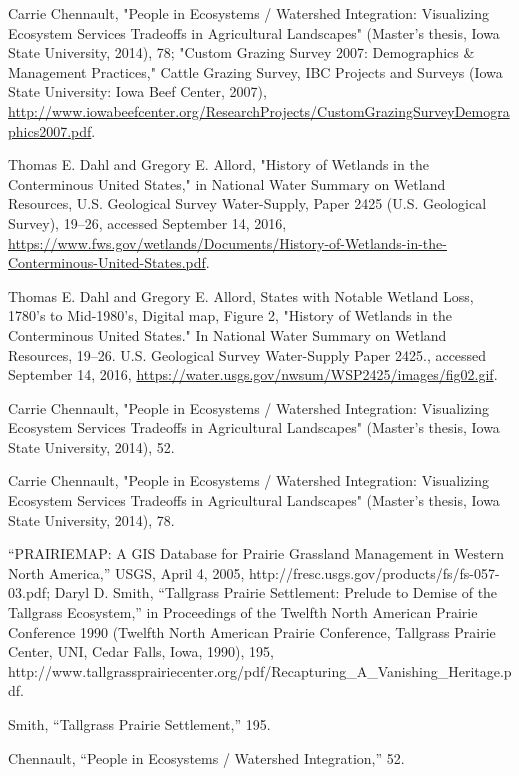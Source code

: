 \documentclass[11pt]{article}
\begin{document}
\begin{thebibliography}{1}
  Carrie Chennault, "People in Ecosystems / Watershed Integration: Visualizing Ecosystem Services Tradeoffs in Agricultural Landscapes" (Master’s thesis, Iowa State University, 2014), 78; "Custom Grazing Survey 2007: Demographics \& Management Practices," Cattle Grazing Survey, IBC Projects and Surveys (Iowa State University: Iowa Beef Center, 2007), \url{http://www.iowabeefcenter.org/ResearchProjects/CustomGrazingSurveyDemographics2007.pdf}.
  
  
  Thomas E. Dahl and Gregory E. Allord, "History of Wetlands in the Conterminous United States," in National Water Summary on Wetland Resources, U.S. Geological Survey Water-Supply, Paper 2425 (U.S. Geological Survey), 19–26, accessed September 14, 2016, \url{https://www.fws.gov/wetlands/Documents/History-of-Wetlands-in-the-Conterminous-United-States.pdf}.
  
  Thomas E. Dahl and Gregory E. Allord, States with Notable Wetland Loss, 1780’s to Mid-1980’s, Digital map, Figure 2, "History of Wetlands in the Conterminous United States." In National Water Summary on Wetland Resources, 19–26. U.S. Geological Survey Water-Supply Paper 2425., accessed September 14, 2016, \url{https://water.usgs.gov/nwsum/WSP2425/images/fig02.gif}.
  
  Carrie Chennault, "People in Ecosystems / Watershed Integration: Visualizing Ecosystem Services Tradeoffs in Agricultural Landscapes" (Master’s thesis, Iowa State University, 2014), 52.
  
  Carrie Chennault, "People in Ecosystems / Watershed Integration: Visualizing Ecosystem Services Tradeoffs in Agricultural Landscapes" (Master’s thesis, Iowa State University, 2014), 78.
  
  “PRAIRIEMAP: A GIS Database for Prairie Grassland Management in Western North America,” USGS, April 4, 2005, http://fresc.usgs.gov/products/fs/fs-057-03.pdf; Daryl D. Smith, “Tallgrass Prairie Settlement: Prelude to Demise of the Tallgrass Ecosystem,” in Proceedings of the Twelfth North American Prairie Conference 1990 (Twelfth North American Prairie Conference, Tallgrass Prairie Center, UNI, Cedar Falls, Iowa, 1990), 195, http://www.tallgrassprairiecenter.org/pdf/Recapturing_A_Vanishing_Heritage.pdf.
  
 Smith, “Tallgrass Prairie Settlement,” 195.
   
  Chennault, “People in Ecosystems / Watershed Integration,” 52.
   

\end{thebibliography}
\end{document}
